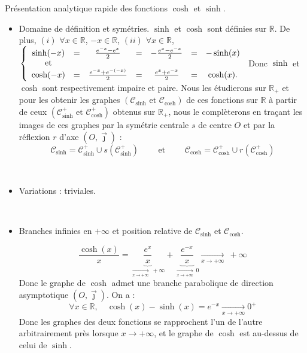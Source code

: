 \documentclass{article}
\begin{document}
\begin{question_kholle}{Présentation analytique rapide des fonctions \(\cosh\) et \(\sinh \).}
	~\smallbreak
	
	\begin{itemize}[label=$\bullet$]
		\item Domaine de définition et symétries.
		\newline
		$\sinh$ et $\cosh$ sont définies sur $\mathbb{R}$. 
		\newline
		De plus, 
		\newline
		$(i)$ $\forall x \in \mathbb{R}$, $-x\in \mathbb{R}$, 
		\newline
		$(ii)$ $\forall x \in \mathbb{R}$, 
		$
			\left\{ \begin{array}{c c c c c c c}
			\sinh (-x) & = & \frac{e^{-x} - e^{x}}{2} & = & - \frac{e^x - e^{-x}}{2} & = & -\sinh(x) \\
			\text{et} & & & & & & \\ 
			\cosh (-x) & = & \frac{e^{-x} + e^{-(-x)}}{2} & = &  \frac{e^x + e^{-x}}{2} & = & \cosh(x).
			\end{array} 
			\right.
		$
		\newline
		Donc $\sinh$ et $\cosh$ sont respectivement impaire et paire.
		\newline
		Nous les étudierons sur $\mathbb{R}_+$ et pour les obtenir les graphes $(\mathcal{C}_{\sinh} \text{ et } \mathcal{C}_{\cosh})$ de ces fonctions sur $\mathbb{R}$ à partir de ceux $(\mathcal{C}_{\sinh}^+ \text{ et } \mathcal{C}_{\cosh}^+)$ obtenus sur $\mathbb{R}_+$, nous le complèterons en traçant les images de ces graphes par la symétrie centrale $s$ de centre $O$ et par la réflexion $r$ d'axe $\left( O, \overrightarrow{\jmath} \right)$ : 
		\[
			\mathcal{C}_{\sinh} = \mathcal{C}_{\sinh}^+ \cup s \left( \mathcal{C}_{\sinh}^+ \right) \qquad \text{ et } \qquad \mathcal{C}_{\cosh} = \mathcal{C}_{\cosh}^+ \cup r \left( \mathcal{C}_{\cosh}^+ \right)
		\]
		
		\
		
		\item Variations : triviales.
		
		\
		
		\item Branches infinies en $+\infty$ et position relative de $\mathcal{C}_{\sinh}$ et $\mathcal{C}_{\cosh}$.
		
		\[
			\frac{\cosh(x)}{x} = \underset{\xrightarrow[x\to +\infty]{} \ +\infty}{\underbrace{\frac{e^{x}}{x}}} + \underset{\xrightarrow[x\to +\infty]{} \ 0}{\underbrace{\frac{e^{-x}}{x}}} \xrightarrow[x\to +\infty]{} \ +\infty
		\]
		Donc le graphe de $\cosh$ admet une branche parabolique de direction asymptotique $\left( O, \overrightarrow{\jmath}\right)$.
		\newline
		On a : 
		\[
			\forall x \in \mathbb{R}, \quad \cosh(x) - \sinh(x) = e^{-x} \xrightarrow[x\to +\infty]{} 0^+
		\]
		Donc les graphes des deux fonctions se rapprochent l'un de l'autre arbitrairement près lorsque $x \to +\infty$, et le graphe de $\cosh$ est au-dessus de celui de $\sinh$.
		

\end{itemize}
\end{question_kholle}
\end{document}
